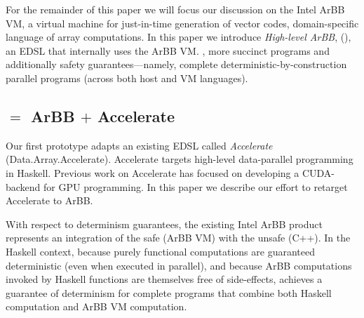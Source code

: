 
{For the remainder of this paper we will focus our discussion
  on the Intel ArBB VM, a virtual machine for just-in-time
  generation of vector codes,  domain-specific
  language of array computations.  In this paper we introduce
  {\em High-level ArBB}, 
  (\systemname{}), an EDSL that internally uses the ArBB
  VM.  ,
\systemname{} 
  more succinct programs and additionally safety
  guarantees---namely, complete deterministic-by-construction parallel
  programs (across both host and VM languages).}


\subsection{\accarbb{} $=$ ArBB $+$ Accelerate}
\label{sec:accelerate-arbb}

Our first \systemname{} prototype adapts an existing EDSL called {\em
  Accelerate} (Data.Array.Accelerate).  Accelerate targets high-level
data-parallel programming in Haskell.
Previous work on Accelerate has focused on developing a CUDA-backend
for GPU programming.  In this paper we describe our effort to retarget
Accelerate to ArBB.  

With respect to determinism guarantees, the existing Intel ArBB product
represents an integration of the safe (ArBB VM) with the unsafe (C++).
In the Haskell context, because purely functional computations are
guaranteed deterministic (even when executed in parallel), and because
ArBB computations invoked by Haskell functions are themselves free of
side-effects, \systemname{} achieves a
guarantee of determinism for complete programs that combine both
Haskell computation and ArBB VM computation.


